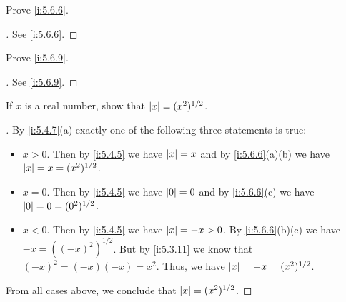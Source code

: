 \exercisesection

\begin{ex}\label{i:ex:5.6.1}
  Prove \cref{i:5.6.6}.
\end{ex}

\begin{proof}[]
  See \cref{i:5.6.6}.
\end{proof}

\begin{ex}\label{i:ex:5.6.2}
  Prove \cref{i:5.6.9}.
\end{ex}

\begin{proof}[]
  See \cref{i:5.6.9}.
\end{proof}

\begin{ex}\label{i:ex:5.6.3}
  If \(x\) is a real number, show that \(\left\lvert x\right\rvert = (x^2)^{1 / 2}\).
\end{ex}

\begin{proof}[]
  By \cref{i:5.4.7}(a) exactly one of the following three statements is true:
  \begin{itemize}
    \item \(x > 0\).
          Then by \cref{i:5.4.5} we have \(\left\lvert x\right\rvert = x\) and by \cref{i:5.6.6}(a)(b) we have \(\left\lvert x\right\rvert = x = (x^2)^{1 / 2}\).
    \item \(x = 0\).
          Then by \cref{i:5.4.5} we have \(\left\lvert0\right\rvert = 0\) and by \cref{i:5.6.6}(c) we have \(\left\lvert0\right\rvert = 0 = (0^2)^{1 / 2}\).
    \item \(x < 0\).
          Then by \cref{i:5.4.5} we have \(\left\lvert x\right\rvert = -x > 0\).
          By \cref{i:5.6.6}(b)(c) we have \(-x = ((-x)^2)^{1 / 2}\).
          But by \cref{i:5.3.11} we know that \((-x)^2 = (-x)(-x) = x^2\).
          Thus, we have \(\left\lvert x\right\rvert = -x = (x^2)^{1 / 2}\).
  \end{itemize}
  From all cases above, we conclude that \(\left\lvert x\right\rvert = (x^2)^{1 / 2}\).
\end{proof}
